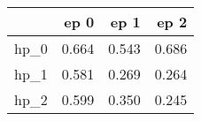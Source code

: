 \begin{tabular}{lrrr}
\toprule
{} &   ep 0 &   ep 1 &   ep 2 \\
\midrule
hp\_0 &  0.664 &  0.543 &  0.686 \\
hp\_1 &  0.581 &  0.269 &  0.264 \\
hp\_2 &  0.599 &  0.350 &  0.245 \\
\bottomrule
\end{tabular}
